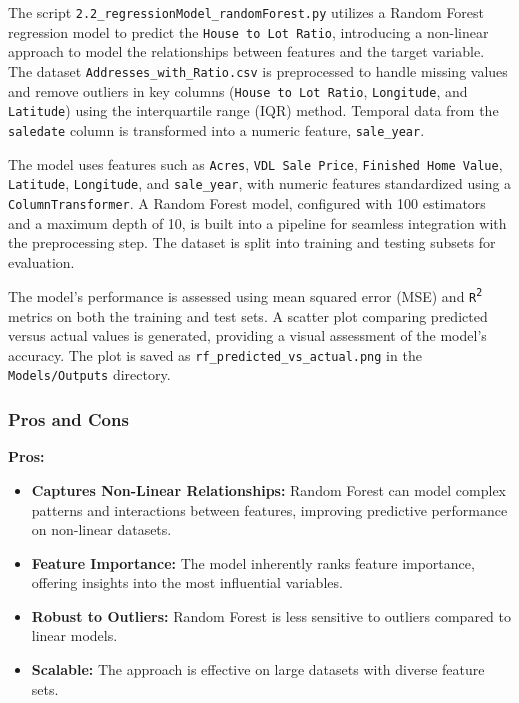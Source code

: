 The script \texttt{2.2\_regressionModel\_randomForest.py} utilizes a Random Forest regression model to predict the \texttt{House to Lot Ratio}, introducing a non-linear approach to model the relationships between features and the target variable. The dataset \texttt{Addresses\_with\_Ratio.csv} is preprocessed to handle missing values and remove outliers in key columns (\texttt{House to Lot Ratio}, \texttt{Longitude}, and \texttt{Latitude}) using the interquartile range (IQR) method. Temporal data from the \texttt{saledate} column is transformed into a numeric feature, \texttt{sale\_year}.

The model uses features such as \texttt{Acres}, \texttt{VDL Sale Price}, \texttt{Finished Home Value}, \texttt{Latitude}, \texttt{Longitude}, and \texttt{sale\_year}, with numeric features standardized using a \texttt{ColumnTransformer}. A Random Forest model, configured with 100 estimators and a maximum depth of 10, is built into a pipeline for seamless integration with the preprocessing step. The dataset is split into training and testing subsets for evaluation.

The model's performance is assessed using mean squared error (MSE) and \texttt{R\textsuperscript{2}} metrics on both the training and test sets. A scatter plot comparing predicted versus actual values is generated, providing a visual assessment of the model’s accuracy. The plot is saved as \texttt{rf\_predicted\_vs\_actual.png} in the \texttt{Models/Outputs} directory.

\subsubsection*{Pros and Cons}

\textbf{Pros:}
\begin{itemize}
    \item \textbf{Captures Non-Linear Relationships:} Random Forest can model complex patterns and interactions between features, improving predictive performance on non-linear datasets.
    \item \textbf{Feature Importance:} The model inherently ranks feature importance, offering insights into the most influential variables.
    \item \textbf{Robust to Outliers:} Random Forest is less sensitive to outliers compared to linear models.
    \item \textbf{Scalable:} The approach is effective on large datasets with diverse feature sets.
\end{itemize}


